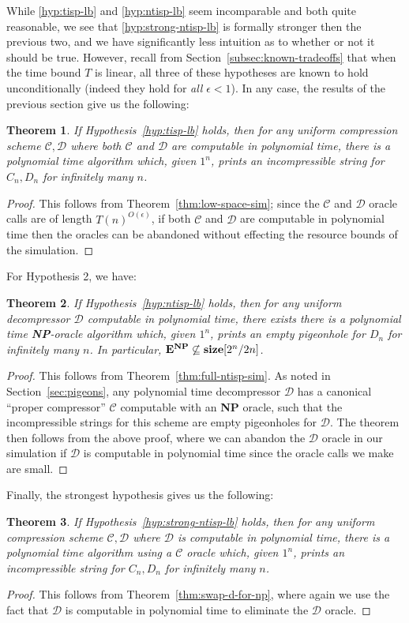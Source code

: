 \documentclass[11pt]{article}
\newtheorem{theorem}{Theorem}
\def\cl{\bf}
\begin{document}
While \ref{hyp:tisp-lb} and \ref{hyp:ntisp-lb} seem incomparable and both quite reasonable, we see that \ref{hyp:strong-ntisp-lb} is formally stronger then the previous two, and we have significantly less intuition as to whether or not it should be true. However, recall from Section~\ref{subsec:known-tradeoffs} that when the time bound $T$ is linear, all three of these hypotheses are known to hold unconditionally (indeed they hold for \emph{all} $\epsilon < 1$). In any case, the results of the previous section give us the following:
\begin{theorem}\label{thm:tisp-impl}
If Hypothesis~\ref{hyp:tisp-lb} holds, then for any uniform compression scheme $\mathcal{C},\mathcal{D}$ where both $\mathcal{C}$ and $\mathcal{D}$ are computable in polynomial time, there is a polynomial time algorithm which, given $1^n$, prints an incompressible string for $C_n,D_n$ for infinitely many $n$.
\end{theorem}
\begin{proof}
This follows from Theorem~\ref{thm:low-space-sim}; since the $\mathcal{C}$ and $\mathcal{D}$ oracle calls are of length $T(n)^{O(\epsilon)}$, if both $\mathcal{C}$ and $\mathcal{D}$ are computable in polynomial time then the oracles can be abandoned without effecting the resource bounds of the simulation.
\end{proof}
For Hypothesis 2, we have:
\begin{theorem}\label{thm:full-ntisp-impl}
If Hypothesis~\ref{hyp:ntisp-lb} holds, then for any uniform decompressor $\mathcal{D}$ computable in polynomial time, there exists there is a polynomial time {\cl NP}-oracle algorithm which, given $1^n$, prints an empty pigeonhole for $D_n$ for infinitely many $n$. In particular, ${\cl E}^{\cl NP} \not\subseteq {\cl size}[2^n/2n]$.
\end{theorem}
\begin{proof}
This follows from Theorem~\ref{thm:full-ntisp-sim}. As noted in Section~\ref{sec:pigeons}, any polynomial time decompressor $\mathcal{D}$ has a canonical ``proper compressor'' $\mathcal{C}$ computable with an {\cl NP} oracle, such that the incompressible strings for this scheme are empty pigeonholes for $\mathcal{D}$. The theorem then follows from the above proof, where we can abandon the $\mathcal{D}$ oracle in our simulation if $\mathcal{D}$ is computable in polynomial time since the oracle calls we make are small.
\end{proof}

Finally, the strongest hypothesis gives us the following:
\begin{theorem}\label{thm:swap-d-impl}
If Hypothesis~\ref{hyp:strong-ntisp-lb} holds, then for any uniform compression scheme $\mathcal{C},\mathcal{D}$ where $\mathcal{D}$ is computable in polynomial time, there is a polynomial time algorithm using a $\mathcal{C}$ oracle which, given $1^n$, prints an incompressible string for $C_n,D_n$ for infinitely many $n$.
\end{theorem}
\begin{proof}
This follows from Theorem~\ref{thm:swap-d-for-np}, where again we use the fact that $\mathcal{D}$ is computable in polynomial time to eliminate the $\mathcal{D}$ oracle.
\end{proof}
\end{document}

